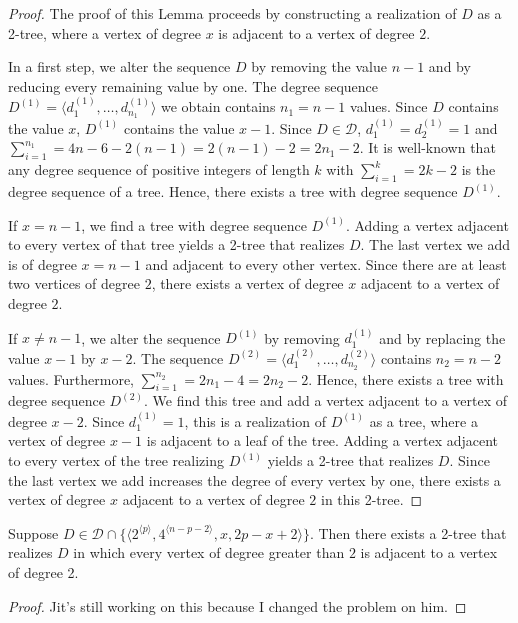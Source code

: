 \documentclass[lotsofwhite,charterfonts]{patmorin}
\newcommand{\rep}[1]{^{\langle#1\rangle}}
\begin{document}
\begin{proof} 
The proof of this Lemma proceeds by constructing a realization of $D$
as a 2-tree, where a vertex of degree $x$ is adjacent to a vertex of
degree $2$.

In a first step, we alter the sequence $D$ by removing the value $n-1$
and by reducing every remaining value by one. The degree sequence
$D^{(1)} = \langle d_1^{(1)},\ldots,d_{n_1}^{(1)}\rangle$ we obtain
contains $n_1 = n-1$ values. Since $D$ contains the value $x$,
$D^{(1)}$ contains the value $x-1$. Since $D\in \mathcal{D}$,
$d_1^{(1)} = d_2^{(1)} = 1$ and $\sum_{i=1}^{n_1} = 4n-6 - 2(n-1) =
2(n-1) - 2 = 2n_1 - 2$. It is well-known that any degree sequence of
positive integers of length $k$ with $\sum_{i=1}^{k} = 2k - 2$ is the
degree sequence of a tree. Hence, there exists a tree with degree
sequence $D^{(1)}$.

If $x = n-1$, we find a tree with degree sequence $D^{(1)}$. Adding a
vertex adjacent to every vertex of that tree yields a 2-tree that
realizes $D$. The last vertex we add is of degree $x = n-1$ and
adjacent to every other vertex. Since there are at least two vertices
of degree $2$, there exists a vertex of degree $x$ adjacent to a
vertex of degree $2$.

If $x \neq n-1$, we alter the sequence $D^{(1)}$ by removing
$d_1^{(1)}$ and by replacing the value $x-1$ by $x-2$. The sequence
$D^{(2)} = \langle d_1^{(2)},\ldots,d_{n_2}^{(2)}\rangle$ contains
$n_2 = n-2$ values. Furthermore, $\sum_{i=1}^{n_2} = 2n_1 - 4 = 2n_2 -
2$. Hence, there exists a tree with degree sequence $D^{(2)}$. We find
this tree and add a vertex adjacent to a vertex of degree $x-2$. Since
$d_1^{(1)} = 1$, this is a realization of $D^{(1)}$ as a tree, where a
vertex of degree $x-1$ is adjacent to a leaf of the tree. Adding a
vertex adjacent to every vertex of the tree realizing $D^{(1)}$ yields
a 2-tree that realizes $D$. Since the last vertex we add increases the
degree of every vertex by one, there exists a vertex of degree $x$
adjacent to a vertex of degree $2$ in this 2-tree.  \end{proof}

\begin{lem}
Suppose $D\in \mathcal{D}\cap \{\langle
2\rep{p},4\rep{n-p-2},x,2p-x+2\rangle\}$.  Then there exists a 2-tree
that realizes $D$ in which every vertex of degree greater than $2$ is
adjacent to a vertex of degree 2.
\end{lem}

\begin{proof}
Jit's still working on this because I changed the problem on him.
\end{proof}
\end{document}
